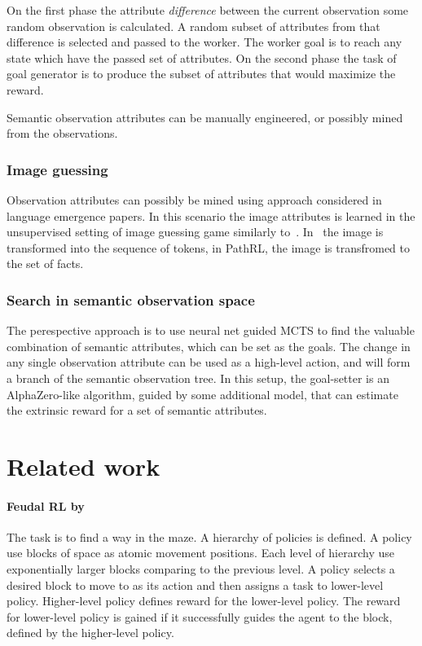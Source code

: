 \documentclass[acmsmall, nonacm]{acmart}
\begin{document}
On the first phase the attribute \textit{difference} between the current observation some random observation is calculated. A random subset of attributes from that difference is selected and passed to the worker. The worker goal is to reach any state which have the passed set of attributes. On the second phase the task of goal generator is to produce the subset of attributes that would maximize the reward.

Semantic observation attributes can be manually engineered, or possibly mined from the observations.

\subsubsection{Image guessing}

Observation attributes can possibly be mined using approach considered in language emergence papers. In this scenario the image attributes is learned in the unsupervised setting of image guessing game similarly to~\citet{Havrylov2017EmergenceOL}. In~\citet{Havrylov2017EmergenceOL} the image is transformed into the sequence of tokens, in PathRL, the image is transfromed to the set of facts.

\subsubsection{Search in semantic observation space}

The perespective approach is to use neural net guided MCTS to find the valuable combination of semantic attributes, which can be set as the goals. The change in any single observation attribute  can be used as a high-level action, and will form a branch of the semantic observation tree. In this setup, the goal-setter is an AlphaZero-like algorithm, guided by some additional model, that can estimate the extrinsic reward for a set of semantic attributes.

\section{Related work}
\label{sec:related_work}

\paragraph{Feudal RL by~\citet{Dayan1992FeudalRL}} %
\label{par:feudal_rl}

The task is to find a way in the maze. A hierarchy of policies is defined. A policy use blocks of space as atomic movement positions. Each level of hierarchy use exponentially larger blocks comparing to the previous level. A policy selects a desired block to move to as its action and then assigns a task to lower-level policy. Higher-level policy defines reward for the lower-level policy. The reward for lower-level policy is gained if it successfully guides the agent to the block, defined by the higher-level policy.
\end{document}
